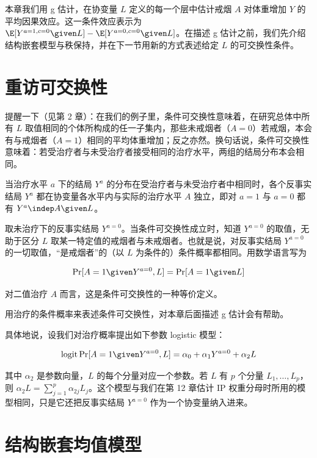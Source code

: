 本章我们用 g 估计，在协变量 $L$ 定义的每一个层中估计戒烟 $A$ 对体重增加 $Y$ 的平均因果效应。这一条件效应表示为 $\E[Y^{a=1,c=0}\given L]-\E[Y^{a=0,c=0}\given L]$。在描述 g 估计之前，我们先介绍结构嵌套模型与秩保持，并在下一节用新的方式表述给定 $L$ 的可交换性条件。

\section{重访可交换性}

提醒一下（见第 2 章）：在我们的例子里，条件可交换性意味着，在研究总体中所有 $L$ 取值相同的个体所构成的任一子集内，那些未戒烟者（$A=0$）若戒烟，本会有与戒烟者（$A=1$）相同的平均体重增加；反之亦然。换句话说，条件可交换性意味着：若受治疗者与未受治疗者接受相同的治疗水平，两组的结局分布本会相同。


当治疗水平 $a$ 下的结局 $Y^a$ 的分布在受治疗者与未受治疗者中相同时，各个反事实结局 $Y^a$ 都在协变量各水平内与实际的治疗水平 $A$ 独立，即对 $a=1$ 与 $a=0$ 都有 $Y^a\indep A\given L$。

取未治疗下的反事实结局 $Y^{a=0}$。当条件可交换性成立时，知道 $Y^{a=0}$ 的取值，无助于区分 $L$ 取某一特定值的戒烟者与未戒烟者。也就是说，对反事实结局 $Y^{a=0}$ 的一切取值，“是戒烟者”的（以 $L$ 为条件的）条件概率都相同。用数学语言写为

\[
\Pr[A=1\given Y^{a=0},L]=\Pr[A=1\given L]
\]

对二值治疗 $A$ 而言，这是条件可交换性的一种等价定义。

用治疗的条件概率来表述条件可交换性，对本章后面描述 g 估计会有帮助。

具体地说，设我们对治疗概率提出如下参数 logistic 模型：

\[
\operatorname{logit}\Pr[A=1\given Y^{a=0},L]=\alpha_0+\alpha_1Y^{a=0}+\alpha_2L
\]


其中 $\alpha_2$ 是参数向量，$L$ 的每个分量对应一个参数。若 $L$ 有 $p$ 个分量 $L_1,\dots,L_p$，则 $\alpha_2L=\sum_{j=1}^{p}\alpha_{2j}L_j$。这个模型与我们在第 12 章估计 IP 权重分母时所用的模型相同，只是它还把反事实结局 $Y^{a=0}$ 作为一个协变量纳入进来。

\section{结构嵌套均值模型}

